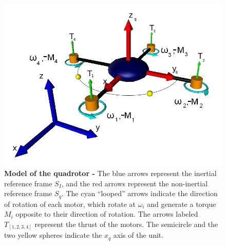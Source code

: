 \documentclass[conference]{IEEEtran}
\begin{document}
\begin{figure}[h!]
	\centering
	\includegraphics[width=.7\columnwidth]{./pics_paper/quad_coord.jpg}
	\vspace{-5pt}
	\caption{\textbf{Model of the quadrotor -} The blue arrows represent the inertial reference frame $S_I$, and the red arrows represent the non-inertial reference frame $S_q$. The cyan ``looped'' arrows indicate the direction of rotation of each motor, which rotate at $\omega_i$ and generate a torque $M_i$ opposite to their direction of rotation. The arrows labeled $T_{[1,2,3,4]}$ represent the thrust of the motors. The semicircle and the two yellow spheres indicate the $x_q$ axis of the unit.}
	\label{fig:quad}
\end{figure}
\end{document}
